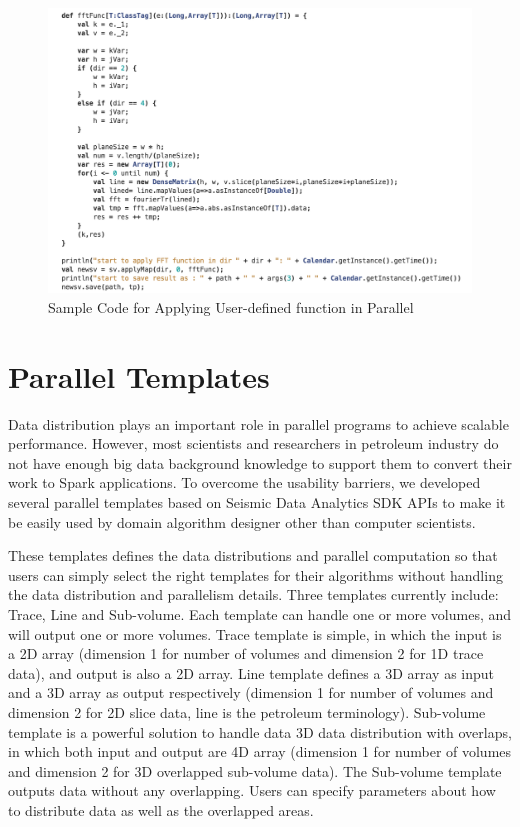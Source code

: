 \begin{figure}[h]
\centering
\includegraphics[scale=0.6]{figures/code_apply.png}
\caption{Sample Code for Applying User-defined function in Parallel}
\label{code_apply}
\end{figure}


\section{Parallel Templates}

Data distribution plays an important role in parallel programs to achieve scalable performance. However, most scientists and researchers in petroleum industry do not have enough big data background knowledge to support them to convert their work to Spark applications. To overcome the usability barriers, we developed several parallel templates based on Seismic Data Analytics SDK APIs to make it be easily used by domain algorithm designer other than computer scientists.

These templates defines the data distributions and parallel computation so that users can simply select the right templates for their algorithms without handling the data distribution and parallelism details. Three templates currently include: Trace, Line and Sub-volume. Each template can handle one or more volumes, and will output one or more volumes. Trace template is simple, in which the input is a 2D array (dimension 1 for number of volumes and dimension 2 for 1D trace data), and output is also a 2D array. Line template defines a 3D array as input and a 3D array as output respectively (dimension 1 for number of volumes and dimension 2 for 2D slice data, line is the petroleum terminology). Sub-volume template is a powerful solution to handle data 3D data distribution with overlaps, in which both input and output are 4D array (dimension 1 for number of volumes and dimension 2 for 3D overlapped sub-volume data). The Sub-volume template outputs data without any overlapping. Users can specify parameters about how to distribute data as well as the overlapped areas. 

